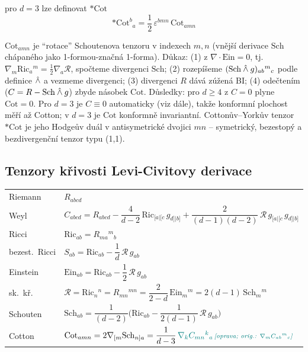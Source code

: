 pro $d = 3$ lze definovat  ${*}\mathrm{Cot}$
\[
  {*}\mathrm{Cot}^{b}{}_{a} = \frac12\,\varepsilon^{bmn}\,\mathrm{Cot}_{amn}
\]

\begin{vysvetleni}
$\mathrm{Cot}_{amn}$ je ``rotace'' Schoutenova tenzoru v indexech $m,n$ (vnější derivace $\mathrm{Sch}$ chápaného jako 1-formou-značná 1-forma). Důkaz: (1) z $\nabla\cdot\mathrm{Ein}=0$, tj.\ $\nabla_m\mathrm{Ric}_a{}^m=\tfrac12\nabla_a\mathcal{R}$, spočteme divergenci $\mathrm{Sch}$; (2) rozepíšeme $(\mathrm{Sch}\owedge g)_{ab}{}^{m}{}_{c}$ podle definice $\owedge$ a vezmeme divergenci; (3) divergenci $R$ dává zúžená BI; (4) odečtením ($C=R-\mathrm{Sch}\owedge g$) zbyde násobek $\mathrm{Cot}$.
Důsledky: pro $d\geq4$ z $C=0$ plyne $\mathrm{Cot}=0$. Pro $d=3$ je $C\equiv0$ automaticky (viz dále), takže konformní plochost měří až Cotton; v $d=3$ je $\mathrm{Cot}$ konformně invariantní. Cottonův--Yorkův tenzor ${*}\mathrm{Cot}$ je jeho Hodgeův duál v antisymetrické dvojici $mn$ -- symetrický, bezestopý a bezdivergenční tenzor typu (1,1).
\end{vysvetleni}

\subsection*{Tenzory křivosti Levi-Civitovy derivace}
\begin{veta}[Přehled]
\renewcommand{\arraystretch}{1.9}
\begin{tabular}{@{}ll@{}}
  Riemann & $R_{abcd}$ \\
  Weyl & $C_{abcd} = R_{abcd} - \dfrac{4}{d-2}\,\mathrm{Ric}_{[a|[c}\,g_{d]|b]} + \dfrac{2}{(d-1)(d-2)}\,\mathcal{R}\,g_{[a|[c}\,g_{d]|b]}$ \\
  Ricci & $\mathrm{Ric}_{ab} = R_{ma}{}^{m}{}_{b}$ \\
  bezest.\ Ricci & $S_{ab} = \mathrm{Ric}_{ab} - \dfrac1d\,\mathcal{R}\,g_{ab}$ \\
  Einstein & $\mathrm{Ein}_{ab} = \mathrm{Ric}_{ab} - \dfrac12\,\mathcal{R}\,g_{ab}$ \\
  sk.\ kř. & $\mathcal{R} = \mathrm{Ric}_n{}^{n} = R_{mn}{}^{mn} = \dfrac{2}{2-d}\,\mathrm{Ein}_m{}^{m} = 2(d-1)\,\mathrm{Sch}_m{}^{m}$ \\[6pt]
  Schouten & $\mathrm{Sch}_{ab} = \dfrac{1}{(d-2)}\Big(\mathrm{Ric}_{ab} - \dfrac{1}{2(d-1)}\,\mathcal{R}\,g_{ab}\Big)$ \\
  Cotton & $\mathrm{Cot}_{amn} = 2\nabla_{[m}\mathrm{Sch}_{n]a} = \dfrac{1}{d-3}\,\oprava{\nabla_k C_{mn}{}^{k}{}_{a}}{\nabla_m C_{ab}{}^{m}{}_{c}}$
\end{tabular}
\end{veta}

